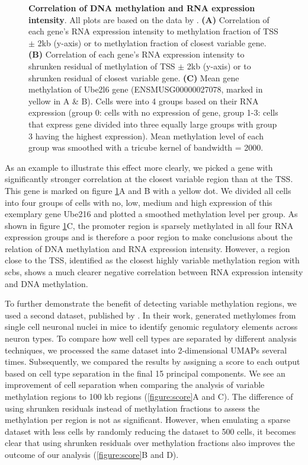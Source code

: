 \documentclass[twocolumn,10pt]{article}
\begin{document}
\begin{figure}[!htp]
	\caption{\small \textbf{Correlation of DNA methylation and RNA expression intensity}. All plots are based on the data by \citealp{Argelaguet_2019}.
	\textbf{(A)} Correlation of each gene's RNA expression intensity to methylation fraction of TSS $\pm$ 2kb (y-axis) or to methylation fraction of closest variable gene.
	\textbf{(B)} Correlation of each gene's RNA expression intensity to shrunken residual of methylation of TSS $\pm$ 2kb (y-axis) or to shrunken residual of closest variable gene.
	\textbf{(C)} Mean gene methylation of Ube2l6 gene (ENSMUSG00000027078, marked in yellow in A \& B). Cells were into 4 groups based on their RNA expression (group 0: cells with no expression of gene, group 1-3: cells that express gene divided into three equally large groups with group 3 having the highest expression). Mean methylation level of each group was smoothed with a tricube kernel of bandwidth = 2000.}
	\label{figure:correlation}
\end{figure}

As an example to illustrate this effect more clearly, we picked a gene with significantly stronger correlation at the closest variable region than at the TSS. This gene is marked on figure \ref{figure:correlation}A and B with a yellow dot. We divided all cells into four groups of cells with no, low, medium and high expression of this exemplary gene Ube216 and plotted a smoothed methylation level per group. As shown in figure \ref{figure:correlation}C, the promoter region is sparsely methylated in all four RNA expression groups and is therefore a poor region to make conclusions about the relation of DNA methylation and RNA expression intensity. However, a region close to the TSS, identified as the closest highly variable methylation region with scbs, shows a much clearer negative correlation between RNA expression intensity and DNA methylation.  


To further demonstrate the benefit of detecting variable methylation regions, we used a second dataset, published by \citealp{Luo_2017}. In their work, \citealp{Luo_2017} generated methylomes from single cell neuronal nuclei in mice to identify genomic regulatory elements across neuron types. To compare how well cell types are separated by different analysis techniques, we processed the same dataset into 2-dimensional UMAPs several times. Subsequently, we compared the results by assigning a score to each output based on cell type separation in the final 15 principal components. We see an improvement of cell separation when comparing the analysis of variable methylation regions to 100 kb regions (\ref{figure:score}A and C). The difference of using shrunken residuals instead of methylation fractions to assess the methylation per region is not as significant. However, when emulating a sparse dataset with less cells by randomly reducing the dataset to 500 cells, it becomes clear that using shrunken residuals over methylation fractions also improves the outcome of our analysis (\ref{figure:score}B and D). 
\end{document}
